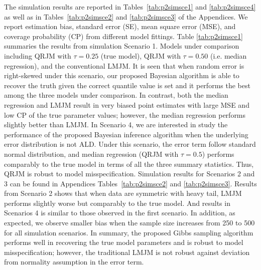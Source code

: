 The simulation results are reported in Tables~\ref{tab:p2simsce1} and \ref{tab:p2simsce4} as well as in Tables~\ref{tab:p2simsce2} and \ref{tab:p2simsce3} of the Appendices. We report estimation bias, standard error (SE), mean square error (MSE), and coverage probability (CP) from different model fittings. Table \ref{tab:p2simsce1} summaries the results from simulation Scenario 1. Models under comparison including QRJM with $\tau=0.25$ (true model), QRJM with $\tau=0.50$ (i.e. median regression), and the conventional LMJM. It is seen that when random error is right-skewed under this scenario, our proposed Bayesian algorithm is able to recover the truth given the correct quantile value is set and it performs the best among the three models under comparison. In contrast, both the median regression and LMJM result in very biased point estimates with large MSE and low CP of the true parameter values; however, the median regression performs slightly better than LMJM. In Scenario 4, we are interested in study the performance of the proposed Bayesian inference algorithm when the underlying error distribution is not ALD. Under this scenario, the error term follow standard normal distribution, and median regression (QRJM with $\tau=0.5$) performs comparably to the true model in terms of all the three summary statistics. Thus, QRJM is robust to model misspecification. Simulation results for Scenarios 2 and 3 can be found in Appendices Tables~\ref{tab:p2simsce2} and \ref{tab:p2simsce3}. Results from Scenario 2 shows that when data are symmetric with heavy tail, LMJM performs slightly worse but comparably to the true model. And results in Scenarios 4 is similar to those observed in the first scenario. In addition, as expected, we observe smaller bias when the sample size increases from 250 to 500 for all simulation scenarios. In summary, the proposed Gibbs sampling algorithm performs well in recovering the true model parameters and is robust to model misspecification; however, the traditional LMJM is not robust against deviation from normality assumption in the error term.


